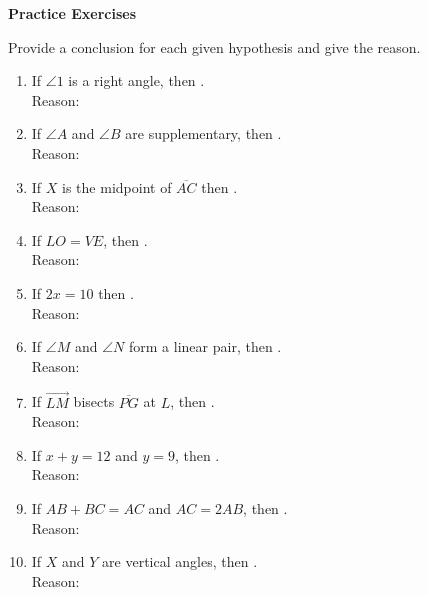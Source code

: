 \textbf{Practice Exercises}

\vspce

Provide a conclusion for each given hypothesis and give the reason. 

\begin{enumerate}[label = \arabic*. ]
\item If $\angle{1} $ is a right angle, then \blank. \\
Reason: \blank 
\item If $\angle{A} $ and $\angle{B} $ are supplementary, then \blank. \\
Reason: \blank 
\item If $X$ is the midpoint of $\overline{AC} $ then \blank. \\
Reason: \blank 
\item If $LO = VE$,  then \blank. \\
Reason: \blank 
\item If $2x = 10$ then \blank. \\
Reason: \blank 
\item If $\angle{M}$ and $\angle{N}$ form a linear pair, then \blank. \\
Reason: \blank 
\item If $\overrightarrow{LM} $ bisects $\overline{PG}$ at $L$, then \blank. \\
Reason: \blank 
\item If $x+y= 12$ and $y=9$, then \blank. \\
Reason: \blank 
\item If $AB + BC = AC$ and $AC= 2AB$, then \blank. \\
Reason: \blank 
\item If $X$ and $Y$ are vertical angles, then \blank. \\
Reason: \blank 
\end{enumerate} 